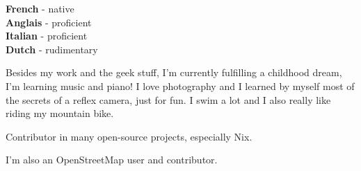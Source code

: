 
\begin{minipage}[t]{.2\textwidth}
	\vspace{-\baselineskip} %


	\textbf{French} - native\\
	\textbf{Anglais} - proficient\\
	\textbf{Italian} - proficient\\
	\textbf{Dutch} - rudimentary\\
\end{minipage}
\hfill
\begin{minipage}[t]{.45\textwidth}
	\vspace{-\baselineskip} %


    Besides my work and the geek stuff, I’m currently fulfilling a childhood dream, I’m learning music and piano!
    I love photography and I learned by myself most of the secrets of a reflex camera, just for fun.
    I swim a lot and I also really like riding my mountain bike.
\end{minipage}
\hfill
\begin{minipage}[t]{.30\textwidth}
	\vspace{-\baselineskip} %


    Contributor in many open-source projects, especially Nix.

    I'm also an OpenStreetMap user and contributor.
\end{minipage}
\hfill
